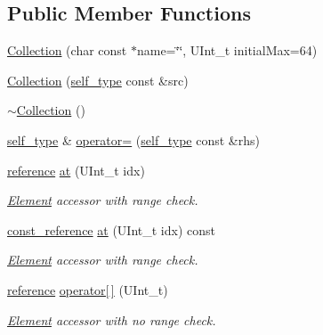 \subsection*{Public Member Functions}
\begin{DoxyCompactItemize}
\item 
\hyperlink{classpanda_1_1Collection_a12046f6682c2934a208f3535d44ae56f}{Collection} (char const $\ast$name=\char`\"{}\char`\"{}, UInt\_\-t initialMax=64)
\item 
\hyperlink{classpanda_1_1Collection_a065b038d41d0437ddacdab9f22f6d397}{Collection} (\hyperlink{classpanda_1_1Collection}{self\_\-type} const \&src)
\item 
\hyperlink{classpanda_1_1Collection_a4fbdded1eb81d5781265ff4cc9f6197a}{$\sim$Collection} ()
\item 
\hyperlink{classpanda_1_1Collection}{self\_\-type} \& \hyperlink{classpanda_1_1Collection_af2065fa6ed20c1fe1dd54b33f83e7778}{operator=} (\hyperlink{classpanda_1_1Collection}{self\_\-type} const \&rhs)
\item 
\hyperlink{classpanda_1_1Collection_a908a535fcc02ad985ac9eb974f02546f}{reference} \hyperlink{classpanda_1_1Collection_a9a3c9aa1d2ba874da225156c9103b3fe}{at} (UInt\_\-t idx)
\begin{DoxyCompactList}\small\item\em \hyperlink{classpanda_1_1Element}{Element} accessor with range check. \item\end{DoxyCompactList}\item 
\hyperlink{classpanda_1_1Collection_a0b74becc406f47de15442c670ae70caf}{const\_\-reference} \hyperlink{classpanda_1_1Collection_a39187584e51bc0f3cb2b4dd59f71dfa4}{at} (UInt\_\-t idx) const 
\begin{DoxyCompactList}\small\item\em \hyperlink{classpanda_1_1Element}{Element} accessor with range check. \item\end{DoxyCompactList}\item 
\hyperlink{classpanda_1_1Collection_a908a535fcc02ad985ac9eb974f02546f}{reference} \hyperlink{classpanda_1_1Collection_a418aee57adfa79bf4db3ea1e7def58c4}{operator\mbox{[}$\,$\mbox{]}} (UInt\_\-t)
\begin{DoxyCompactList}\small\item\em \hyperlink{classpanda_1_1Element}{Element} accessor with no range check. \item\end{DoxyCompactList}\item 

\end{DoxyCompactItemize}
